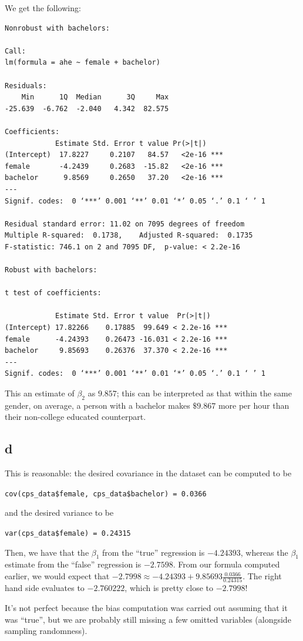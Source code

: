 \documentclass[12pt,letterpaper]{article}
\theoremstyle{definition}
\begin{document}
We get the following:
\begin{Verbatim}[fontsize=\small]
Nonrobust with bachelors:

Call:
lm(formula = ahe ~ female + bachelor)

Residuals:
    Min      1Q  Median      3Q     Max
-25.639  -6.762  -2.040   4.342  82.575

Coefficients:
            Estimate Std. Error t value Pr(>|t|)
(Intercept)  17.8227     0.2107   84.57   <2e-16 ***
female       -4.2439     0.2683  -15.82   <2e-16 ***
bachelor      9.8569     0.2650   37.20   <2e-16 ***
---
Signif. codes:  0 ‘***’ 0.001 ‘**’ 0.01 ‘*’ 0.05 ‘.’ 0.1 ‘ ’ 1

Residual standard error: 11.02 on 7095 degrees of freedom
Multiple R-squared:  0.1738,	Adjusted R-squared:  0.1735
F-statistic: 746.1 on 2 and 7095 DF,  p-value: < 2.2e-16

Robust with bachelors:

t test of coefficients:

            Estimate Std. Error t value  Pr(>|t|)
(Intercept) 17.82266    0.17885  99.649 < 2.2e-16 ***
female      -4.24393    0.26473 -16.031 < 2.2e-16 ***
bachelor     9.85693    0.26376  37.370 < 2.2e-16 ***
---
Signif. codes:  0 ‘***’ 0.001 ‘**’ 0.01 ‘*’ 0.05 ‘.’ 0.1 ‘ ’ 1
\end{Verbatim}

This an estimate of \(\beta_{2}\) as \(9.857\); this can be interpreted as that within the same gender, on average, a person with a bachelor makes \(\$9.867\) more per hour than their non-college educated counterpart.

\subsection*{d}

This is reasonable: the desired covariance in the dataset can be computed to be

\verb|cov(cps_data$female, cps_data$bachelor) = 0.0366|

and the desired variance to be

\verb|var(cps_data$female) = 0.24315|

Then, we have that the \(\beta_1\) from the ``true'' regression is \(-4.24393\), whereas the \(\beta_1\) estimate from the ``false'' regression is \(-2.7598\). From our formula computed earlier, we would expect that \(-2.7998\approx  -4.24393 + 9.85693\frac{0.0366}{0.24315}\). The right hand side evaluates to \(-2.760222\), which is pretty close to \(-2.7998\)!

It's not perfect because the bias computation was carried out assuming that it was ``true'', but we are probably still missing a few omitted variables (alongside sampling randomness).
\end{document}
